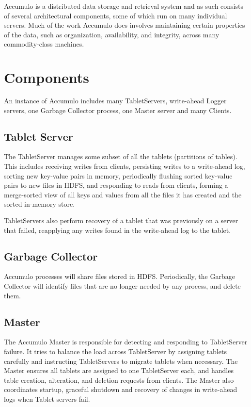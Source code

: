 Accumulo is a distributed data storage and retrieval system and as such consists of
several architectural components, some of which run on many individual servers.
Much of the work Accumulo does involves maintaining certain properties of the
data, such as organization, availability, and integrity, across many commodity-class
machines.

\section{Components}

An instance of Accumulo includes many TabletServers, write-ahead Logger
servers, one Garbage Collector process, one Master server and many Clients.

\subsection{Tablet Server}

The TabletServer manages some subset of all the tablets (partitions of tables). This includes receiving writes from clients, persisting writes to a
write-ahead log, sorting new key-value pairs in memory, periodically
flushing sorted key-value pairs to new files in HDFS, and responding
to reads from clients, forming a merge-sorted view of all keys and
values from all the files it has created and the sorted in-memory
store.

TabletServers also perform recovery of a tablet
that was previously on a server that failed, reapplying any writes
found in the write-ahead log to the tablet.

\subsection{Garbage Collector}

Accumulo processes will share files stored in HDFS.  Periodically, the Garbage
Collector will identify files that are no longer needed by any process, and
delete them.

\subsection{Master}

The Accumulo Master is responsible for detecting and responding to TabletServer
failure. It tries to balance the load across TabletServer by assigning tablets carefully
and instructing TabletServers to migrate tablets when necessary. The Master ensures all
tablets are assigned to one TabletServer each, and handles table creation, alteration,
and deletion requests from clients. The Master also coordinates startup, graceful
shutdown and recovery of changes in write-ahead logs when Tablet servers fail.

